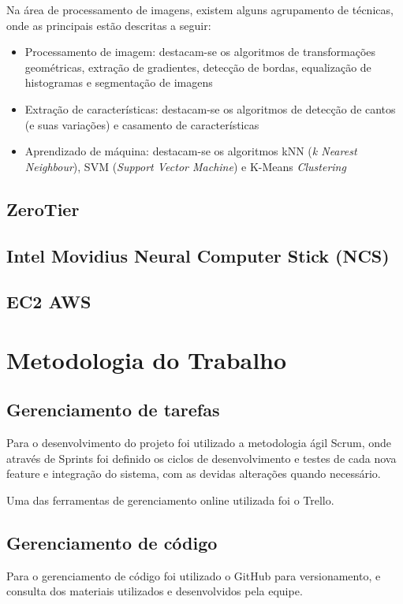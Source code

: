 \documentclass[]{politex}
\begin{document}
Na área de processamento de imagens, existem alguns agrupamento de técnicas, onde as principais estão descritas a seguir:
\begin{itemize}
    \item Processamento de imagem: destacam-se os algoritmos de transformações geométricas, extração de gradientes, detecção de bordas, equalização de histogramas e segmentação de imagens
    \item Extração de características: destacam-se os algoritmos de detecção de cantos (e suas variações) e casamento de características
    \item Aprendizado de máquina: destacam-se os algoritmos kNN (\textit{k Nearest Neighbour}), SVM (\textit{Support Vector Machine}) e K-Means \textit{Clustering}
\end{itemize}

\section{ZeroTier}
\section{Intel Movidius Neural Computer Stick (NCS)}
\section{EC2 AWS}

\chapter{Metodologia do Trabalho}
\section{Gerenciamento de tarefas}
Para o desenvolvimento do projeto foi utilizado a metodologia ágil Scrum, onde através de Sprints foi definido os ciclos de desenvolvimento e testes de cada nova feature e integração do sistema, com as devidas alterações quando necessário.

Uma das ferramentas de gerenciamento online utilizada foi o Trello.

\section{Gerenciamento de código}
Para o gerenciamento de código foi utilizado o GitHub para versionamento, e consulta dos materiais utilizados e desenvolvidos pela equipe. 
\end{document}
